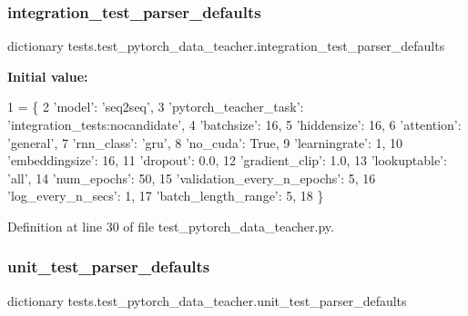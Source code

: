 \subsubsection{\texorpdfstring{integration\+\_\+test\+\_\+parser\+\_\+defaults}{integration\_test\_parser\_defaults}}
{\footnotesize\ttfamily dictionary tests.\+test\+\_\+pytorch\+\_\+data\+\_\+teacher.\+integration\+\_\+test\+\_\+parser\+\_\+defaults}

{\bfseries Initial value\+:}
\begin{DoxyCode}
1 =  \{
2     \textcolor{stringliteral}{'model'}: \textcolor{stringliteral}{'seq2seq'},
3     \textcolor{stringliteral}{'pytorch\_teacher\_task'}: \textcolor{stringliteral}{'integration\_tests:nocandidate'},
4     \textcolor{stringliteral}{'batchsize'}: 16,
5     \textcolor{stringliteral}{'hiddensize'}: 16,
6     \textcolor{stringliteral}{'attention'}: \textcolor{stringliteral}{'general'},
7     \textcolor{stringliteral}{'rnn\_class'}: \textcolor{stringliteral}{'gru'},
8     \textcolor{stringliteral}{'no\_cuda'}: \textcolor{keyword}{True},
9     \textcolor{stringliteral}{'learningrate'}: 1,
10     \textcolor{stringliteral}{'embeddingsize'}: 16,
11     \textcolor{stringliteral}{'dropout'}: 0.0,
12     \textcolor{stringliteral}{'gradient\_clip'}: 1.0,
13     \textcolor{stringliteral}{'lookuptable'}: \textcolor{stringliteral}{'all'},
14     \textcolor{stringliteral}{'num\_epochs'}: 50,
15     \textcolor{stringliteral}{'validation\_every\_n\_epochs'}: 5,
16     \textcolor{stringliteral}{'log\_every\_n\_secs'}: 1,
17     \textcolor{stringliteral}{'batch\_length\_range'}: 5,
18 \}
\end{DoxyCode}


Definition at line 30 of file test\+\_\+pytorch\+\_\+data\+\_\+teacher.\+py.

\mbox{\label{namespacetests_1_1test__pytorch__data__teacher_a20b08dfc55904cf898ea79dec26a4a52}} 
\subsubsection{\texorpdfstring{unit\+\_\+test\+\_\+parser\+\_\+defaults}{unit\_test\_parser\_defaults}}
{\footnotesize\ttfamily dictionary tests.\+test\+\_\+pytorch\+\_\+data\+\_\+teacher.\+unit\+\_\+test\+\_\+parser\+\_\+defaults}

